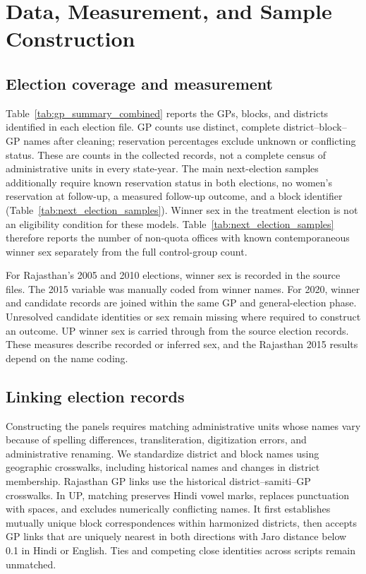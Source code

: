 \section{Data, Measurement, and Sample Construction}\label{sec:app_data}
\suppressfloats[t]

\subsection{Election coverage and measurement}

Table~\ref{tab:gp_summary_combined} reports the GPs, blocks, and districts identified in each election file. GP counts use distinct, complete district--block--GP names after cleaning; reservation percentages exclude unknown or conflicting status. These are counts in the collected records, not a complete census of administrative units in every state-year. The main next-election samples additionally require known reservation status in both elections, no women's reservation at follow-up, a measured follow-up outcome, and a block identifier (Table~\ref{tab:next_election_samples}). Winner sex in the treatment election is not an eligibility condition for these models. Table~\ref{tab:next_election_samples} therefore reports the number of non-quota offices with known contemporaneous winner sex separately from the full control-group count.

For Rajasthan's 2005 and 2010 elections, winner sex is recorded in the source files. The 2015 variable was manually coded from winner names. For 2020, winner and candidate records are joined within the same GP and general-election phase. Unresolved candidate identities or sex remain missing where required to construct an outcome. UP winner sex is carried through from the source election records. These measures describe recorded or inferred sex, and the Rajasthan 2015 results depend on the name coding.

\subsection{Linking election records}

Constructing the panels requires matching administrative units whose names vary because of spelling differences, transliteration, digitization errors, and administrative renaming. We standardize district and block names using geographic crosswalks, including historical names and changes in district membership. Rajasthan GP links use the historical district--samiti--GP crosswalks. In UP, matching preserves Hindi vowel marks, replaces punctuation with spaces, and excludes numerically conflicting names. It first establishes mutually unique block correspondences within harmonized districts, then accepts GP links that are uniquely nearest in both directions with Jaro distance below 0.1 in Hindi or English. Ties and competing close identities across scripts remain unmatched.


